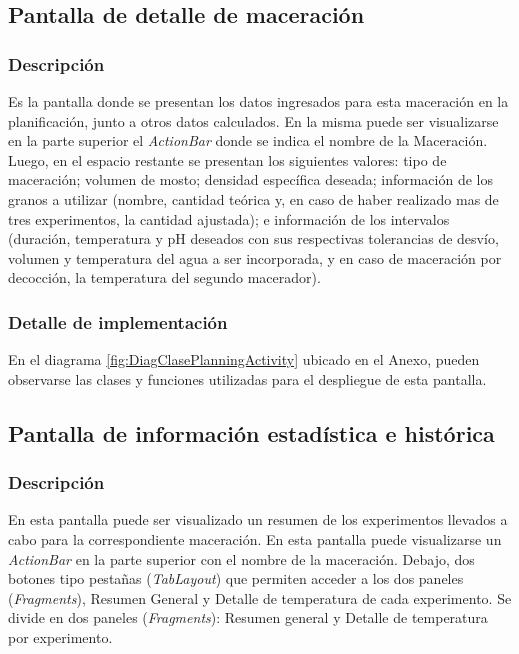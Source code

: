            
        \subsection{Pantalla de detalle de maceración}
        \label{DescripPantallaDetalleMaceración}
            \subsubsection{Descripción}
            Es la pantalla donde se presentan los datos ingresados para esta maceración en la planificación, junto a otros datos calculados.
            En la misma puede ser visualizarse en la parte superior el \textit{ActionBar} donde se indica el nombre de la Maceración. Luego, en el espacio restante se presentan los siguientes valores: tipo de maceración; volumen de mosto; densidad específica deseada; información de los granos a utilizar (nombre, cantidad teórica y, en caso de haber realizado mas de tres experimentos, la cantidad ajustada); e información de los intervalos (duración, temperatura y pH deseados con sus respectivas tolerancias de desvío, volumen y temperatura del agua a ser incorporada, y en caso de maceración por decocción, la temperatura del segundo macerador).
            
            \subsubsection{Detalle de implementación}
            En el diagrama \ref{fig:DiagClasePlanningActivity} ubicado en el Anexo, pueden observarse las clases y funciones utilizadas para el despliegue de esta pantalla.
        
            
        \subsection{Pantalla de información estadística e histórica}
        \label{DescripPantallaEstadística}
            \subsubsection{Descripción}
            En esta pantalla puede ser visualizado un resumen de los experimentos llevados a cabo para la correspondiente maceración.
            En esta pantalla puede visualizarse un \textit{ActionBar} en la parte superior con el nombre de la maceración. Debajo, dos botones tipo pestañas (\textit{TabLayout}) que permiten acceder a los dos paneles (\textit{Fragments}), Resumen General y Detalle de temperatura de cada experimento. 
            Se divide en dos paneles (\textit{Fragments}): Resumen general y Detalle de temperatura por experimento.
            
